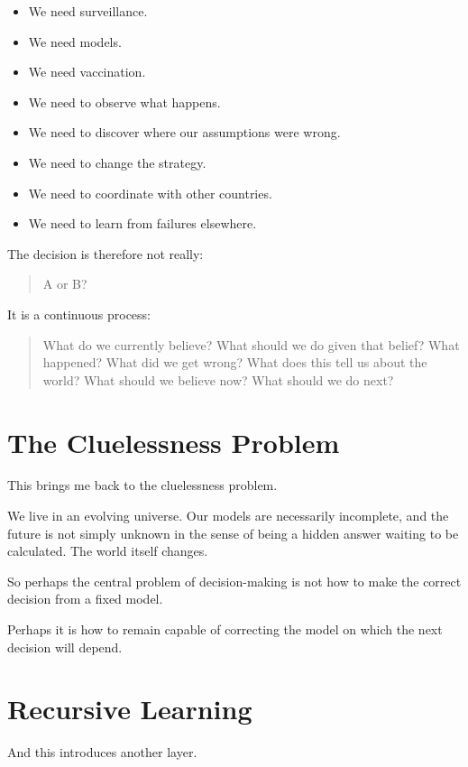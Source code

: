 \documentclass{article}
\begin{document}
\begin{itemize}
    \item We need surveillance.
    \item We need models.
    \item We need vaccination.
    \item We need to observe what happens.
    \item We need to discover where our assumptions were wrong.
    \item We need to change the strategy.
    \item We need to coordinate with other countries.
    \item We need to learn from failures elsewhere.
\end{itemize}

The decision is therefore not really:

\begin{quote}
    A or B?
\end{quote}

It is a continuous process:

\begin{quote}
    What do we currently believe? What should we do given that belief? What happened? What did we get wrong? What does this tell us about the world? What should we believe now? What should we do next?
\end{quote}

\section*{The Cluelessness Problem}

This brings me back to the cluelessness problem.

We live in an evolving universe. Our models are necessarily incomplete, and the future is not simply unknown in the sense of being a hidden answer waiting to be calculated. The world itself changes.

So perhaps the central problem of decision-making is not how to make the correct decision from a fixed model.

Perhaps it is how to remain capable of correcting the model on which the next decision will depend.

\section*{Recursive Learning}

And this introduces another layer.
\end{document}
